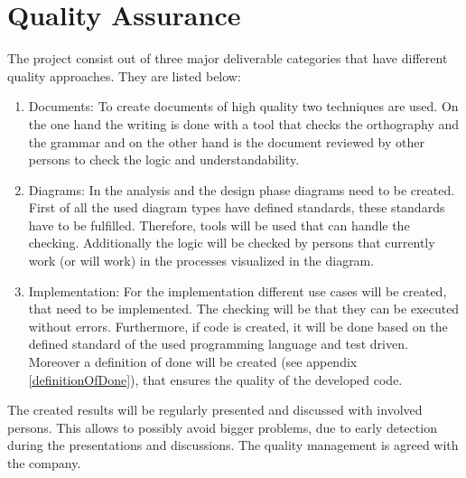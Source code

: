 \section{Quality Assurance}
The project consist out of three major deliverable categories that have different quality approaches. They are listed below:
\begin{enumerate}
	\item Documents: \newline
	To create documents of high quality two techniques are used. On the one hand the writing is done with a tool that checks the orthography and the grammar and on the other hand is the document reviewed by other persons to check the logic and understandability. 
	\item Diagrams: \newline
	In the analysis and the design phase diagrams need to be created. First of all the used diagram types have defined standards, these standards have to be fulfilled. Therefore, tools will be used that can handle the checking. Additionally the logic will be checked by persons that currently work (or will work) in the processes visualized in the diagram. 
	\item Implementation: \newline
	For the implementation different use cases will be created, that need to be implemented. The checking will be that they can be executed without errors. Furthermore, if code is created, it will be done based on the defined standard of the used programming language and test driven. Moreover a definition of done will be created (see appendix \ref{definitionOfDone}), that ensures the quality of the developed code.
\end{enumerate}
The created results will be regularly presented and discussed with involved persons. This allows to possibly avoid bigger problems, due to early detection during the presentations and discussions. The quality management is agreed with the company. 

